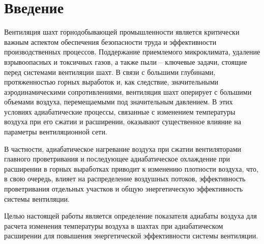 \section{Введение}

Вентиляция шахт горнодобывающей промышленности является критически важным аспектом обеспечения безопасности труда и эффективности производственных процессов. Поддержание приемлемого микроклимата, удаление взрывоопасных и токсичных газов, а также пыли – ключевые задачи, стоящие перед системами вентиляции шахт. В связи с большими глубинами, протяженностью горных выработок и, как следствие, значительными аэродинамическими сопротивлениями, вентиляция шахт оперирует с большими объемами воздуха, перемещаемыми под значительным давлением. В этих условиях адиабатические процессы, связанные с изменением температуры воздуха при его сжатии и расширении, оказывают существенное влияние на параметры вентиляционной сети.

В частности, адиабатическое нагревание воздуха при сжатии вентиляторами главного проветривания и последующее адиабатическое охлаждение при расширении в горных выработках приводит к изменению плотности воздуха, что, в свою очередь, влияет на распределение воздушных потоков, эффективность проветривания отдельных участков и общую энергетическую эффективность системы вентиляции. 

Целью настоящей работы является определение показателя адиабаты воздуха для расчета изменения температуры воздуха в шахтах при адиабатическом расширении для повышения энергетической эффективности системы вентиляции.